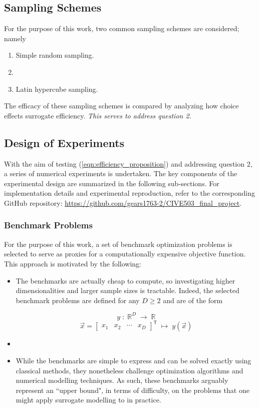 \documentclass[conference]{IEEEtran}
\begin{document}
\subsection{Sampling Schemes}

For the purpose of this work, two common sampling schemes are considered; namely

\begin{enumerate}
	\item Simple random sampling.
	\item []
	\item Latin hypercube sampling.
\end{enumerate}

\noindent The efficacy of these sampling schemes is compared by analyzing how choice effects surrogate efficiency. \textit{This serves to address question 2.}

\subsection{Design of Experiments}

With the aim of testing (\ref{eqn:efficiency_proposition}) and addressing question 2, a series of numerical experiments is undertaken. The key components of the experimental design are summarized in the following sub-sections. For implementation details and experimental reproduction, refer to the corresponding GitHub repository: \url{https://github.com/gears1763-2/CIVE503_final_project}.

\subsubsection{Benchmark Problems}

For the purpose of this work, a set of benchmark optimization problems is selected to serve as proxies for a computationally expensive objective function. This approach is motivated by the following:

\begin{itemize}
	\item The benchmarks are actually cheap to compute, so investigating higher dimensionalities and larger sample sizes is tractable. Indeed, the selected benchmark problems are defined for any $D \geq 2$ and are of the form
	
	$$ y\;:\;\mathbb{R}^D\;\to\;\mathbb{R} $$
	$$ \vec{x} = \begin{bmatrix} x_1 & x_2 & \cdots & x_D \end{bmatrix}^\mathsf{T}\;\mapsto\;y(\vec{x})	 $$	
	
	\item []
	\item While the benchmarks are simple to express and can be solved exactly using classical methods, they nonetheless challenge optimization algorithms and numerical modelling techniques. As such, these benchmarks arguably represent an ``upper bound", in terms of difficulty, on the problems that one might apply surrogate modelling to in practice.
\end{itemize}
\end{document}
